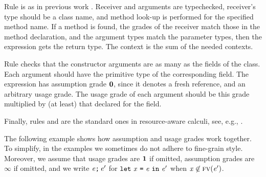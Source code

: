 Rule  is as in previous work \cite{BianchiniDGZ23ecoop}. Receiver and arguments are typechecked, receiver's type should be a class name, and method look-up is performed for the specified method name. If a method is found,  the grades of the receiver match those in the method declaration, and the argument types match the parameter types, then the expression gets the return type. The context is the sum of the needed contexts.


Rule  checks that the constructor arguments are as many as the fields of the class. Each argument should have the primitive type of the corresponding field. 
The expression has assumption grade $\mathbf{0}$, since it denotes a fresh reference, and an arbitrary usage grade. The usage grade of each argument should be this grade multiplied by (at least) that declared for the field. 


Finally, rules  and  are the standard ones in resource-aware calculi, see, e.g., \cite{BianchiniDGZ23oopsla}.

The following example shows how assumption and usage grades work together. 
To simplify, in the examples we  sometimes do not adhere to fine-grain style. Moreover, we  assume that usage grades are $\mathbf{1}$ if omitted, assumption grades are $\infty$ if omitted, and we write $\mathit{e}\texttt{;}\, \mathit{e}'$ for $\texttt{let}\ \mathit{x}\ \texttt{=}\ \mathit{e}\ \texttt{in}\ \mathit{e}'$ when $\mathit{x}\not\in\textsc{fv}(\mathit{e}')$.  

